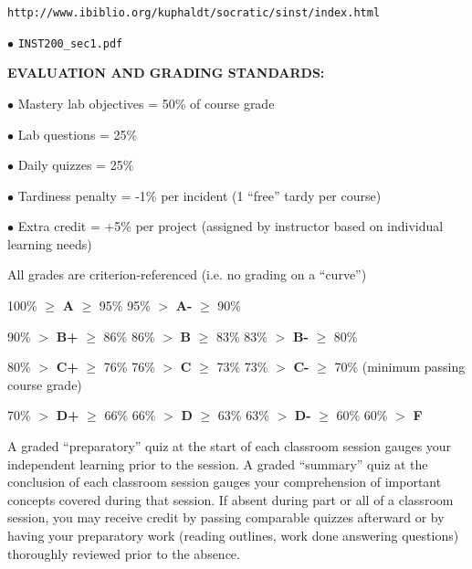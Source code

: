 \noindent
{\tt http://www.ibiblio.org/kuphaldt/socratic/sinst/index.html} 

\vskip 5pt

\item{$\bullet$} {\tt INST200\_sec1.pdf} 


\vfil \eject

\noindent
{\bf EVALUATION AND GRADING STANDARDS:} 

\item{$\bullet$} Mastery lab objectives = 50\% of course grade
\item{$\bullet$} Lab questions = 25\% 
\item{$\bullet$} Daily quizzes = 25\%
\item{$\bullet$} Tardiness penalty = -1\% per incident (1 ``free'' tardy per course)
\item{$\bullet$} Extra credit = +5\% per project (assigned by instructor based on individual learning needs)

\vskip 10pt

\noindent
All grades are criterion-referenced (i.e. no grading on a ``curve'')

\medskip
\item{} 100\% $\geq$ {\bf A} $\geq$ 95\% \hskip 33pt 95\% $>$ {\bf A-} $\geq$ 90\%
\item{} 90\% $>$ {\bf B+} $\geq$ 86\% \hskip 30pt 86\% $>$ {\bf B} $\geq$ 83\% \hskip 30pt 83\% $>$ {\bf B-} $\geq$ 80\%
\item{} 80\% $>$ {\bf C+} $\geq$ 76\% \hskip 30pt 76\% $>$ {\bf C} $\geq$ 73\% \hskip 30pt 73\% $>$ {\bf C-} $\geq$ 70\% (minimum passing course grade)
\item{} 70\% $>$ {\bf D+} $\geq$ 66\% \hskip 30pt 66\% $>$ {\bf D} $\geq$ 63\% \hskip 30pt 63\% $>$ {\bf D-} $\geq$ 60\% \hskip 30pt 60\% $>$ {\bf F}
\medskip

\vskip 10pt

A graded ``preparatory'' quiz at the start of each classroom session gauges your independent learning prior to the session.  A graded ``summary'' quiz at the conclusion of each classroom session gauges your comprehension of important concepts covered during that session.  If absent during part or all of a classroom session, you may receive credit by passing comparable quizzes afterward or by having your preparatory work (reading outlines, work done answering questions) thoroughly reviewed prior to the absence.  

